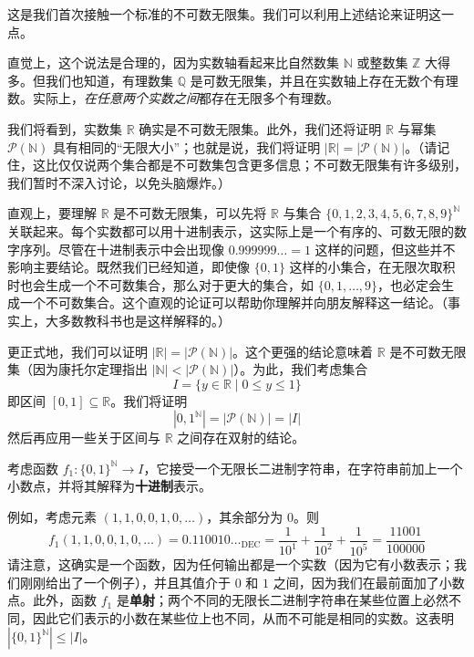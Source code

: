 \begin{example}

    这是我们首次接触一个标准的不可数无限集。我们可以利用上述结论来证明这一点。

    直觉上，这个说法是合理的，因为实数轴看起来比自然数集 $\mathbb{N}$ 或整数集 $\mathbb{Z}$ 大得多。但我们也知道，有理数集 $\mathbb{Q}$ 是可数无限集，并且在实数轴上存在无数个有理数。实际上，\emph{在任意两个实数之间}都存在无限多个有理数。
    
    我们将看到，实数集 $\mathbb{R}$ 确实是不可数无限集。此外，我们还将证明 $\mathbb{R}$ 与幂集 $\mathcal{P}(\mathbb{N})$ 具有相同的``无限大小''；也就是说，我们将证明 $|\mathbb{R}| = |\mathcal{P}(\mathbb{N})|$。（请记住，这比仅仅说两个集合都是不可数集包含更多信息；不可数无限集有许多级别，我们暂时不深入讨论，以免头脑爆炸。）

    直观上，要理解 $\mathbb{R}$ 是不可数无限集，可以先将 $\mathbb{R}$ 与集合 $\{0, 1, 2, 3, 4, 5, 6, 7, 8, 9\}^\mathbb{N}$ 关联起来。每个实数都可以用十进制表示，这实际上是一个有序的、可数无限的数字序列。尽管在十进制表示中会出现像 $0.999999 \dots = 1$ 这样的问题，但这些并不影响主要结论。既然我们已经知道，即使像 $\{0, 1\}$ 这样的小集合，在无限次取积时也会生成一个不可数集合，那么对于更大的集合，如 $\{0, 1, \dots, 9\}$，也必定会生成一个不可数集合。这个直观的论证可以帮助你理解并向朋友解释这一结论。（事实上，大多数教科书也是这样解释的。）

    更正式地，我们可以证明 $|\mathbb{R}| = |\mathcal{P}(\mathbb{N})|$。这个更强的结论意味着 $\mathbb{R}$ 是不可数无限集（因为康托尔定理指出 $|\mathbb{N}| < |\mathcal{P}(\mathbb{N})|$）。为此，我们考虑集合
    \[I = \{y \in \mathbb{R} \mid 0 \le y \le 1\}\]
    即区间 $[0, 1] \subseteq \mathbb{R}$。我们将证明
    \[|{0, 1}^\mathbb{N}| = |\mathcal{P}(\mathbb{N})| = |I|\]
    然后再应用一些关于区间与 $\mathbb{R}$ 之间存在双射的结论。

    考虑函数 $f_1 : \{0, 1\}^{\mathbb{N}} \to I$，它接受一个无限长二进制字符串，在字符串前加上一个小数点，并将其解释为\textbf{十进制}表示。

    例如，考虑元素 $(1, 1, 0, 0, 1, 0, \dots)$，其余部分为 $0$。则
    \[f_1(1, 1, 0, 0, 1, 0, \dots) = 0.110010 \dots _\text{DEC} = \frac{1}{10^1}+\frac{1}{10^2}+\frac{1}{10^5} = \frac{11001}{100000}\]
    请注意，这确实是一个函数，因为任何输出都是一个实数（因为它有小数表示；我们刚刚给出了一个例子），并且其值介于 $0$ 和 $1$ 之间，因为我们在最前面加了小数点。此外，函数 $f_1$ 是\textbf{单射}；两个不同的无限长二进制字符串在某些位置上必然不同，因此它们表示的小数在某些位上也不同，从而不可能是相同的实数。这表明 $|\{0,1\}^{\mathbb{N}}| \le |I|$。


\end{example}

